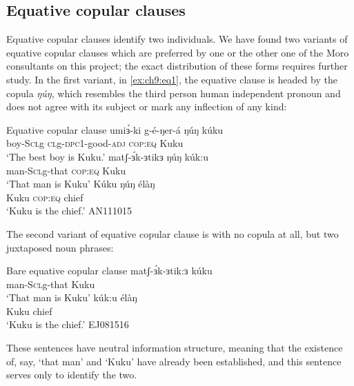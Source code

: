 

\subsection{Equative copular clauses}

Equative copular clauses identify two individuals. We have found two variants of equative copular clauses which are preferred by one or the other one of the Moro consultants on this project; the exact distribution of these forms requires further study. In the first variant, in \ref{ex:ch9:eq1}, the equative clause is headed by the copula \textit{ŋúŋ}, which resembles the third person human independent pronoun and does not agree with its subject or mark any inflection of any kind:

\ea Equative copular clause\label{ex:ch9:eq1}
	\ea \gll	umiɜ́-ki g-é-ŋer-á ŋúŋ kúku \\	
				boy-S\textsc{cl}g \textsc{cl}g-\textsc{dpc}1-good-\textsc{adj} \textsc{cop:eq} Kuku\\
		\glt	‘The best boy is Kuku.’
	\ex	\gll 	matʃ-ɜ́k-ɜtikɜ ŋúŋ kúk:u \\
				man-S\textsc{cl}g-that \textsc{cop:eq} Kuku\\
		\glt	‘That man is Kuku’
	\ex	\gll 	Kúku ŋúŋ élàŋ\\
				Kuku \textsc{cop:eq} chief\\
		\glt	‘Kuku is the chief.’ \hfill AN111015
	\z 
\z

The second variant of equative copular clause is with no copula at all, but two juxtaposed noun phrases:

\ea Bare equative copular clause
	\ea	\gll matʃ-ɜ́k-ɜtik:ɜ	kúku \\
			man-S\textsc{cl}g-that 	Kuku \\
		\glt ‘That man is Kuku’ 
	\ex	\gll kúk:u	élàŋ  	\\
			Kuku	chief 	\\
		\glt ‘Kuku is the chief.’	\hfill 	EJ081516
	\z
\z

These sentences have neutral information structure, meaning that the existence of, say, `that man' and `Kuku' have already been established, and this sentence serves only to identify the two. 



